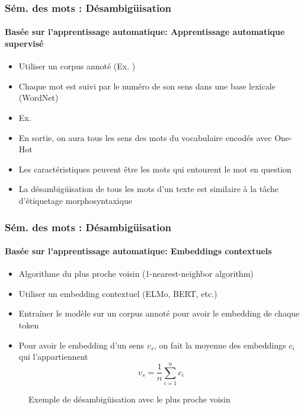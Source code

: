 \documentclass[xcolor=table]{beamer}
\begin{document}
\begin{frame}
\frametitle{Sém. des mots : Désambigüisation}
\framesubtitle{Basée sur l'apprentissage automatique: Apprentissage automatique supervisé}
	
\begin{itemize}
	\item Utiliser un corpus annoté (Ex. )
	\item Chaque mot est suivi par le numéro de son sens dans une base lexicale (WordNet)
	\item Ex. 
	\item En sortie, on aura tous les sens des mots du vocabulaire encodés avec One-Hot
	\item Les caractéristiques peuvent être les mots qui entourent le mot en question
	\item La désambigüisation de tous les mots d'un texte est similaire à la tâche d'étiquetage morphosyntaxique
\end{itemize}
	
\end{frame}

\begin{frame}
\frametitle{Sém. des mots : Désambigüisation}
\framesubtitle{Basée sur l'apprentissage automatique: Embeddings contextuels}

\begin{minipage}{.68\textwidth}
\begin{itemize}
	\item Algorithme du plus proche voisin (1-nearest-neighbor algorithm) 
	\item Utiliser un embedding contextuel (ELMo, BERT, etc.)
	\item Entraîner le modèle sur un corpus annoté pour avoir le embedding de chaque token
	\item Pour avoir le embedding d'un sens $v_s$, on fait la moyenne des embeddings $c_i$ qui l'appartiennent
	\[ v_s = \frac{1}{n} \sum_{i=1}^{n} c_i \] 
\end{itemize}
\end{minipage}
\begin{minipage}{.3\textwidth}
	\begin{figure}
		\caption{Exemple de désambigüisation avec le plus proche voisin \cite{2019-jurafsky-martin}}
	\end{figure}
\end{minipage}

\end{frame}

\end{document}
